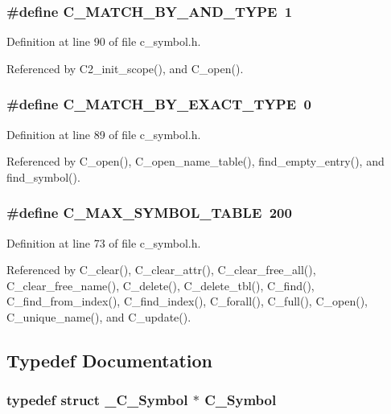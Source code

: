 \subsubsection{\setlength{\rightskip}{0pt plus 5cm}\#define C\_\-MATCH\_\-BY\_\-AND\_\-TYPE~1}\label{c__symbol_8h_4b58e22d848d78d175bbcbaa21fac437}




Definition at line 90 of file c\_\-symbol.h.

Referenced by C2\_\-init\_\-scope(), and C\_\-open().
\subsubsection{\setlength{\rightskip}{0pt plus 5cm}\#define C\_\-MATCH\_\-BY\_\-EXACT\_\-TYPE~0}\label{c__symbol_8h_75e341d1ab93370ae77ee251457bb3aa}




Definition at line 89 of file c\_\-symbol.h.

Referenced by C\_\-open(), C\_\-open\_\-name\_\-table(), find\_\-empty\_\-entry(), and find\_\-symbol().
\subsubsection{\setlength{\rightskip}{0pt plus 5cm}\#define C\_\-MAX\_\-SYMBOL\_\-TABLE~200}\label{c__symbol_8h_5a9cbc6929d8d3b3994d2214e0663e23}




Definition at line 73 of file c\_\-symbol.h.

Referenced by C\_\-clear(), C\_\-clear\_\-attr(), C\_\-clear\_\-free\_\-all(), C\_\-clear\_\-free\_\-name(), C\_\-delete(), C\_\-delete\_\-tbl(), C\_\-find(), C\_\-find\_\-from\_\-index(), C\_\-find\_\-index(), C\_\-forall(), C\_\-full(), C\_\-open(), C\_\-unique\_\-name(), and C\_\-update().

\subsection{Typedef Documentation}
\subsubsection{\setlength{\rightskip}{0pt plus 5cm}typedef struct \bf{\_\-C\_\-Symbol} $\ast$ \bf{C\_\-Symbol}}\label{c__symbol_8h_72b9b9456933a9328ee3dd16a5142342}


